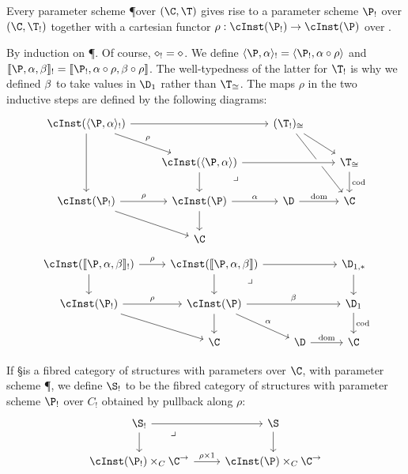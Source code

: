 \begin{enumerate}
\begin{enumerate}
\begin{prob}
  Every parameter scheme \P over $(\C,\T)$ gives rise to a parameter scheme $\P_!$ over $(\C,\T_!)$ together with a cartesian functor $\rho:\cInst(\P_!)\to\cInst(\P)$ over \C.
\end{prob}
\begin{constr}
  By induction on \P.
  Of course, $\diamond_!=\diamond$.
  We define $\typeps{\P}{\al}_! = \typeps{\P_!}{\al\circ \rho}$ and $\termps{\P}{\al}{\be}_! = \termps{\P_!}{\al\circ \rho}{\be\circ \rho}$.
  The well-typedness of the latter for $\T_!$ is why we defined $\beta$ to take values in $\D_1$ rather than $\T_{\cong}$.
  The maps $\rho$ in the two inductive steps are defined by the following diagrams:
    \[
    \begin{tikzcd}
      \cInst(\typeps{\P}{\al}_!) \ar[dr,"\rho"] \ar[rr] \ar[dd] && (\T_!)_{\cong} \ar[dr] \ar[ddr] \\
      & \cInst(\typeps{\P}{\al}) \ar[rr,crossing over] \ar[d] \pullback{dr} && \T_{\cong} \ar[d,"\mathrm{cod}"] \\
      \cInst(\P_!) \ar[r,"\rho"] \ar[dr] & \cInst(\P) \ar[r,"\al"] \ar[d] & \D \ar[r,"\mathrm{dom}"] & \C\\
      & \C
    \end{tikzcd}
    \]
    \[
    \begin{tikzcd}
      \cInst(\termps{\P}{\al}{\be}_!) \ar[r,"\rho"] \ar[d] & \cInst(\termps{\P}{\al}{\be}) \ar[rr] \ar[d] \pullback{dr} & & \D_{1,*} \ar[d] \\
      \cInst(\P_!) \ar[r,"\rho"] \ar[dr] & \cInst(\P) \ar[dr,"\al"] \ar[d] \ar[rr,"\be"] & \phantom{.} & \D_1 \ar[d,"\mathrm{cod}"]\\
      & \C & \D \ar[r,"\mathrm{dom}"] & \C
    \end{tikzcd}
    \]
\end{constr}

\begin{defn}
  If \S is a fibred category of structures with parameters over $\C$, with parameter scheme \P, we define $\S_!$ to be the fibred category of structures with parameter scheme $\P_!$ over $C_!$ obtained by pullback along $\rho:$
  \[
  \begin{tikzcd}
    \S_! \ar[r] \ar[d] \pullback{dr} & \S \ar[d] \\
    \cInst(\P_!)\times_C \C^\to \ar[r,"\rho\times 1"] & \cInst(\P)\times_C \C^\to
  \end{tikzcd}
  \]
\end{defn}


\end{enumerate}
\end{enumerate}
